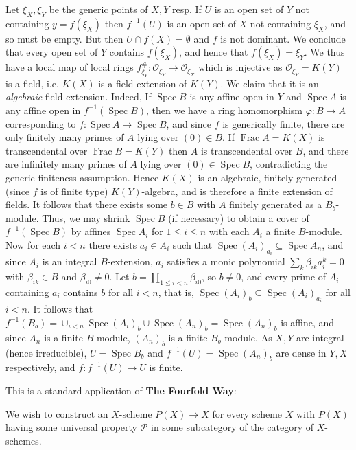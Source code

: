 \documentclass{report}
\renewcommand{\O}{\mathcal{O}}
\DeclareMathOperator{\Spec}{Spec}
\DeclareMathOperator{\Frac}{Frac}
\begin{document}
\bigskip
{}	Let $\xi_X,\xi_Y$ be the generic points of $X,Y$ resp.  If $U$ is an open set of $Y$ not containing $y=f(\xi_X)$
then $f^{-1}(U)$ is an open set of $X$ not containing $\xi_X$, and so must be empty.  But then $U\cap f(X)=\emptyset$
and $f$ is not dominant.  We conclude that every open set of $Y$ contains $f(\xi_X)$, and hence that $f(\xi_X)=\xi_Y$.
We thus have a local map of local rings $f^{\#}_{\xi_Y}:\O_{\xi_Y}\rightarrow \O_{\xi_X}$ which is injective as $\O_{\xi_Y}=K(Y)$
is a field, i.e. $K(X)$ is a field extension of $K(Y)$.	
We claim that it is an {\em algebraic} field extension.  Indeed, 
If $\Spec B$ is any affine open in $Y$ and $\Spec A$ is any affine open in $f^{-1}(\Spec B)$, then we have a 
ring homomorphism $\varphi:B\rightarrow A$ corresponding to $f:\Spec A\rightarrow \Spec B$, and since $f$
is generically finite, there are only finitely many primes of $A$ lying over $(0)\in B$.  If $\Frac A=K(X)$ is transcendental
over $\Frac B=K(Y)$ then $A$ is transcendental over $B$, and there are infinitely many primes of $A$ lying over $(0)\in\Spec B$,
contradicting the generic finiteness assumption.	Hence $K(X)$ is an algebraic, finitely generated (since $f$ is of finite type)
$K(Y)$-algebra, and is therefore a finite extension of fields.  
It follows that there exists some $b\in B$ with $A$ finitely generated as a $B_b$-module.
Thus, we may shrink $\Spec B$ (if necessary) to obtain a cover of $f^{-1}(\Spec B)$ by affines
$\Spec A_i$ for $1\le i\le n$ with each $A_i$ a finite $B$-module.	
Now for each $i<n$ there exists $a_i\in A_i$ such that $\Spec (A_i)_{a_i}\subseteq \Spec A_n$,
and since $A_i$ is an integral $B$-extension, $a_i$ satisfies a monic polynomial $\sum_{k} \beta_{ik}a_i^k=0$
with $\beta_{ik}\in B$ and $\beta_{i0}\neq 0$.		Let $b=\prod_{1\le i< n} \beta_{i0}$, so $b\neq 0$,
and every prime of $A_i$ containing $a_i$ contains $b$ for all $i<n$, that is, 
$\Spec (A_i)_b\subseteq \Spec (A_{i})_{a_i}$ for all $i<n$.	It follows that $f^{-1}(B_b)=\cup_{i<n} \Spec (A_i)_b\cup \Spec (A_n)_{b}=\Spec (A_n)_b$
is affine, and since $A_n$ is a finite $B$-module, $(A_n)_b$ is a finite $B_b$-module.  As $X,Y$ are integral (hence irreducible),
$U=\Spec B_b$ and $f^{-1}(U)=\Spec (A_n)_b$ are dense in $Y,X$ respectively, and $f:f^{-1}(U)\rightarrow U$ is finite.


\bigskip
{}	This is a standard application of {\bf The Fourfold Way}:

We wish to construct an $X$-scheme $P(X) \rightarrow X$ 
for every scheme $X$ with $P(X)$ having some universal
property $\mathcal{P}$ in some  subcategory of the category of $X$-schemes.
\end{document}
